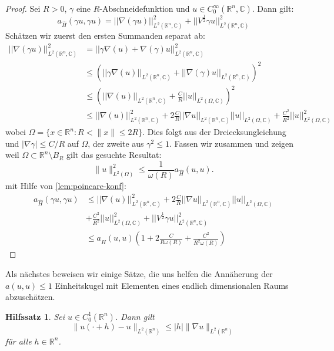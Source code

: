 \documentclass[11pt,a4paper,leqno]{report}
\newtheorem{lemma}[theorem]{Hilfssatz}
\numberwithin{equation}{chapter}
\begin{document}
\begin{proof}
	Sei $R > 0$, $\gamma$ eine $R$-Abschneidefunktion und $u \in C^\infty_0(\mathbb{R}^n, \mathbb{C})$. Dann gilt:
	\begin{equation}
		a_{\hat{H}}(\gamma u , \gamma u) = ||\nabla(\gamma u)||_{L^2(\mathbb{R}^n,\mathbb{C})}^2 + ||V^\frac{1}{2}\gamma u||_{L^2(\mathbb{R}^n,\mathbb{C})}^2
	\end{equation}
	Schätzen wir zuerst den ersten Summanden separat ab:
	\begin{align*}
		||\nabla(\gamma u)||_{L^2(\mathbb{R}^n,\mathbb{C})}^2 &= ||\gamma \nabla(u) + \nabla(\gamma) u||_{L^2(\mathbb{R}^n,\mathbb{C})}^2\\
		&\leq(||\gamma \nabla(u)||_{L^2(\mathbb{R}^n,\mathbb{C})} + ||\nabla(\gamma) u||_{L^2(\mathbb{R}^n,\mathbb{C})})^2\\
		&\leq(||\nabla(u)||_{L^2(\mathbb{R}^n,\mathbb{C})} + \frac{C}{R}||u||_{L^2(\Omega,\mathbb{C})})^2\\
		&\leq||\nabla(u)||_{L^2(\mathbb{R}^n,\mathbb{C})}^2 +2\frac{C}{R}||\nabla u||_{L^2(\mathbb{R}^n,\mathbb{C})}||u||_{L^2(\Omega,\mathbb{C})} + \frac{C^2}{R^2}||u||_{L^2(\Omega,\mathbb{C})}^2
	\end{align*}
	wobei $\Omega = \{x\in\mathbb{R}^n:R < \|x\| \le 2R\}$. Dies folgt aus der Dreiecksungleichung und $|\nabla \gamma| \le C/R$ auf $\Omega$, der zweite aus $\gamma^2 \le 1$.
	Fassen wir zusammen und zeigen weil $\Omega \subset \mathbb{R}^n \setminus B_R$ gilt das gesuchte Resultat:
	\[
	\|u\|_{L^2(\Omega)}^2 \le \frac{1}{\omega(R)} a_{\hat{H}}(u,u).
	\] mit Hilfe von \eqref{lem:poincare-konf}:
	\begin{align*}
		a_{\hat{H}}(\gamma u , \gamma u)&\leq ||\nabla(u)||_{L^2(\mathbb{R}^n,\mathbb{C})}^2 +2\frac{C}{R}||\nabla u||_{L^2(\mathbb{R}^n,\mathbb{C})}||u||_{L^2(\Omega,\mathbb{C})} \\&+ \frac{C^2}{R^2}||u||_{L^2(\Omega,\mathbb{C})}^2 +||V^\frac{1}{2}\gamma u||_{L^2(\mathbb{R}^n,\mathbb{C})}^2\\
		&\leq a_{\hat{H}}(u,u)(1 + 2\frac{C}{R\omega(R)} + \frac{C^2}{R^2\omega(R)})
	\end{align*}
\end{proof}
\noindent
Als nächstes beweisen wir einige Sätze, die uns helfen die Annäherung der $a(u,u)\leq 1$ Einheitskugel mit Elementen eines endlich dimensionalen Raums abzuschätzen.
\begin{lemma}\label{lem:1}
	Sei $u \in C^1_0(\mathbb{R}^n)$. Dann gilt
	\[
	\|u(\cdot + h) - u\|_{L^2(\mathbb{R}^n)} \leq |h| \|\nabla u\|_{L^2(\mathbb{R}^n)}
	\]
	für alle $h \in \mathbb{R}^n$.
\end{lemma}
\end{document}
